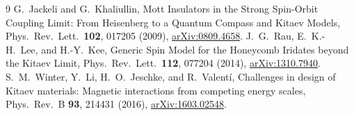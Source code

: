 \documentclass[11pt,a4paper]{article}
\begin{document}
\begin{thebibliography}{9}
 G.~Jackeli and G.~Khaliullin, Mott Insulators in the Strong Spin-Orbit Coupling Limit: From Heisenberg to a Quantum Compass and Kitaev Models, Phys.\ Rev.\ Lett.\ \textbf{102}, 017205 (2009), \href{https://arxiv.org/abs/0809.4658}{arXiv:0809.4658}.
 J.~G.~Rau, E.~K.-H.~Lee, and H.-Y.~Kee, Generic Spin Model for the Honeycomb Iridates beyond the Kitaev Limit, Phys.\ Rev.\ Lett.\ \textbf{112}, 077204 (2014), \href{https://arxiv.org/abs/1310.7940}{arXiv:1310.7940}.
 S.~M.~Winter, Y.~Li, H.~O.~Jeschke, and R.~Valent\'i, Challenges in design of Kitaev materials: Magnetic interactions from competing energy scales, Phys.\ Rev.\ B \textbf{93}, 214431 (2016), \href{https://arxiv.org/abs/1603.02548}{arXiv:1603.02548}.
\end{thebibliography}
\end{document}
